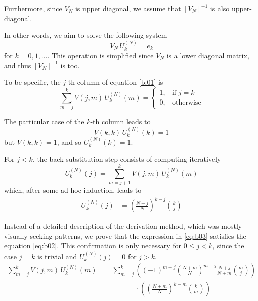 \documentclass{article}
\newcommand{\ppar}[1]{\left( #1 \right)}
\newcommand{\spar}[1]{\left[ #1 \right]}
\begin{document}
Furthermore, since $V_N$ is upper diagonal, we assume that $\spar{V_N}^{-1}$ is also upper-diagonal.







In other words, we aim to solve the following system
\begin{equation}
    V_N\, U_k^{(N)} = e_k
    \label{b:01}
\end{equation}
for $k = 0, 1, \dots$. This operation is simplified since 
$V_N$ is a lower diagonal matrix, and thus $\spar{V_N}^{-1}$ is too.

To be specific, the $j$-th column of equation \eqref{b:01} is
\begin{equation}
    \sum_{m=j}^k V(j,m)\, U_k^{(N)}(m) = 
    \begin{cases}
        1, &\text{if } j=k \\
        0, &\text{otherwise}
    \end{cases}
    \label{eq:b02}
\end{equation}

The particular case of the $k$-th column leads to
\begin{equation}
    V(k,k)\, U_k^{(N)}(k) = 
    1
\end{equation}
but $V(k,k) = 1$, and so $U_k^{(N)}(k) = 1$.

For $j<k$, the back substitution step consists of computing iteratively
\begin{equation}
    U_k^{(N)}(j) = \sum_{m=j+1}^k V(j,m)\, U_k^{(N)}(m)
\end{equation}
which, after some ad hoc induction, leads to
\begin{align}
U_k^{(N)}(j)
    &=
    \ppar{\frac{N+j}{N}}^{k-j} \binom{k}{j}
    \label{eq:b03}
\end{align}

Instead of a detailed description of the derivation method, which was mostly visually seeking patterns, we prove that the expression in \eqref{eq:b03} satisfies the equation \eqref{eq:b02}.
%
This confirmation is only necessary for $0\leq j<k$, since the case $j=k$ is trivial and $U_k^{(N)}(j)=0$ for $j> k$.
\begin{align*}
    \sum_{m=j}^k V(j,m)\, U_k^{(N)}(m)
    &=
    \sum_{m=j}^k 
    \ppar{ (-1)^{m-j} \ppar{\frac{N+m}{N}}^{m-j} \frac{N+j}{N+m} \binom{m}{j} }
    \\
    &\phantom{=}
    \phantom{\sum_{m=j}^k} \cdot
    \ppar{\ppar{\frac{N+m}{N}}^{k-m} \binom{k}{m}}
\end{align*}
\end{document}
